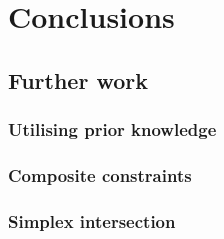 \documentclass[../../main.tex]{subfiles}
\begin{document}
\chapter{Conclusions}

\section{Further work}
\subsection{Utilising prior knowledge}
\subsection{Composite constraints}
\subsection{Simplex intersection}
\end{document}
